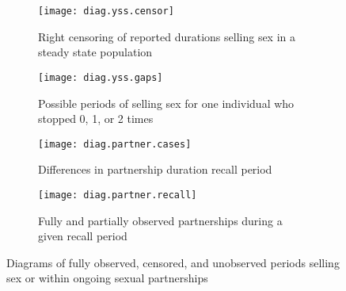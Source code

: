 \begin{figure}
  \begin{subfigure}[b]{\textwidth}
    \centering\texttt{[image: diag.yss.censor]}
    \caption{Right censoring of reported durations selling sex in a steady state population}
    \label{fig:diag.yss.censor}
  \end{subfigure}
  \begin{subfigure}[b]{\textwidth}
    \centering\texttt{[image: diag.yss.gaps]}
    \caption{Possible periods of selling sex for one individual who stopped 0, 1, or 2 times}
    \label{fig:diag.yss.gaps}
  \end{subfigure}
  \begin{subfigure}[b]{\textwidth}
    \centering\texttt{[image: diag.partner.cases]}
    \caption{Differences in partnership duration \vs recall period}
    \label{fig:diag.partner.cases}
  \end{subfigure}
  \begin{subfigure}[b]{\textwidth}
    \centering\texttt{[image: diag.partner.recall]}
    \caption{Fully and partially observed partnerships during a given recall period}
    \label{fig:diag.partner.recall}
  \end{subfigure}
  \caption{Diagrams of fully observed, censored, and unobserved periods
    selling sex or within ongoing sexual partnerships}
  \label{fig:diag}
\end{figure}